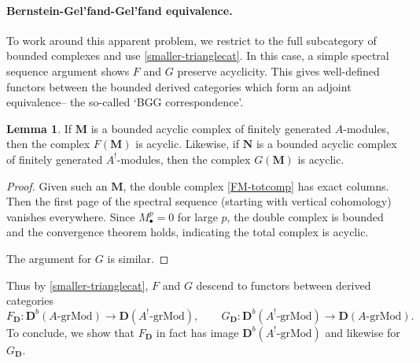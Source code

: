 \documentclass[a4paper]{article}
\theoremstyle{definition}
\newtheorem{lemma}[defn]{Lemma}
\theoremstyle{remark}
\newcommand{\grMod}{\ensuremath{\text{-grMod}}}
\newcommand{\deri}{\mathbf{D}}
\begin{document}
\paragraph{Bernstein-Gel'fand-Gel'fand equivalence.} To work around this apparent
problem, we restrict to the full subcategory of bounded complexes and use
\cref{smaller-trianglecat}. In this case, a simple spectral sequence argument
shows \(F\) and \(G\) preserve acyclicity. This gives well-defined functors
between the bounded derived categories which form an adjoint equivalence-- the
so-called `BGG correspondence'.

\begin{lemma}
    If \(\mathbf{M}\) is a bounded acyclic complex of finitely generated
    \(A\)-modules, then the complex \(F(\mathbf{M})\) is acyclic. Likewise, if
    \(\mathbf{N}\) is a bounded acyclic complex of finitely generated
    \(A^!\)-modules, then the complex \(G(\mathbf{M})\) is acyclic.
    \begin{proof}
        Given such an \(\mathbf{M}\), the double complex \eqref{FM-totcomp} has
        exact columns.  Then the first page of the spectral sequence (starting
        with vertical cohomology) vanishes everywhere. Since \(M^p_\bullet = 0\)
        for large \(p\), the double complex is bounded and the convergence
        theorem holds, indicating the total complex is acyclic.
         
        The argument for \(G\) is similar.
    \end{proof}
\end{lemma}

Thus by \cref{smaller-trianglecat}, \(F\) and
\(G\) descend to functors between derived categories 
\[{F_\deri: \deri^b(A\grMod)\rightarrow \deri(A^!\grMod)}, \qquad G_\deri:
\deri^b(A^!\grMod) \rightarrow \deri(A\grMod).\] 
To conclude, we show that \(F_\deri\) in fact has image \(\deri^b(A^!\grMod)\)
and likewise for \(G_\deri\).
\end{document}
